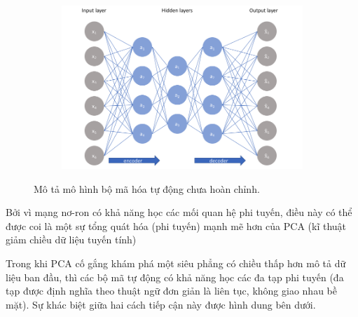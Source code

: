 \begin{figure}
    \begin{subfigure}{0.8\textwidth}
        \includegraphics[width=1.\linewidth]{Chapters/items/auto2.jpg}
        \caption{}
        \label{fig: auto2}
    \end{subfigure}
    \caption{Mô tả mô hình bộ mã hóa tự động chưa hoàn chỉnh.}
\end{figure}

Bởi vì mạng nơ-ron có khả năng học các mối quan hệ phi tuyến,
điều này có thể được coi là một sự tổng quát hóa (phi tuyến)
mạnh mẽ hơn của PCA (kĩ thuật giảm chiều dữ liệu tuyến tính)

\newpage
Trong khi PCA cố gắng khám phá một siêu phẳng có chiều thấp hơn
mô tả dữ liệu ban đầu, thì các bộ mã tự động có khả năng học các
đa tạp phi tuyến (đa tạp được định nghĩa theo thuật ngữ đơn giản
là liên tục, không giao nhau bề mặt). Sự khác biệt giữa hai cách
tiếp cận này được hình dung bên dưới.

